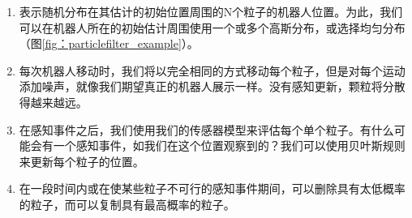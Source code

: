 \begin{enumerate}

\item 表示随机分布在其估计的初始位置周围的N个粒子的机器人位置。为此，我们可以在机器人所在的初始估计周围使用一个或多个高斯分布，或选择均匀分布（图\ref{fig：particlefilter_example}）。
\item 每次机器人移动时，我们将以完全相同的方式移动每个粒子，但是对每个运动添加噪声，就像我们期望真正的机器人展示一样。没有感知更新，颗粒将分散得越来越远。
\item 在感知事件之后，我们使用我们的传感器模型来评估每个单个粒子。有什么可能会有一个感知事件，如我们在这个位置观察到的？我们可以使用贝叶斯规则来更新每个粒子的位置。
\item 在一段时间内或在使某些粒子不可行的感知事件期间，可以删除具有太低概率的粒子，而可以复制具有最高概率的粒子。
\end{enumerate}

